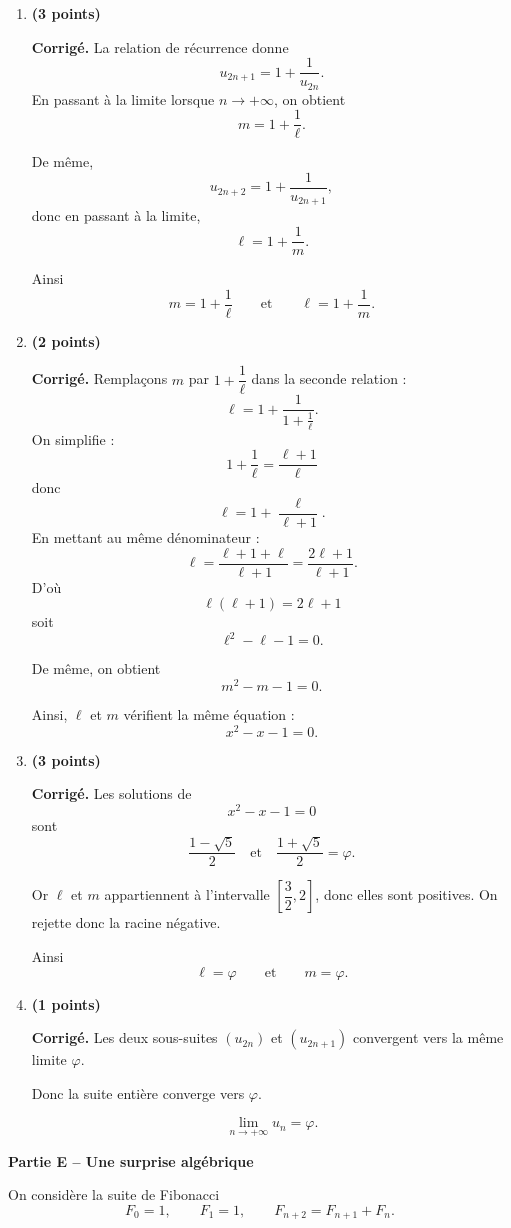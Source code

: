 \documentclass[11pt,a4paper]{article}
\newcommand{\bareme}[1]{\hfill{\color{blue!70!black}\textbf{(#1 points)}}}
\newcommand{\corr}{\noindent\textcolor{blue!70!black}{\textbf{Corrigé. }}}
\begin{document}
\begin{enumerate}[label=\textbf{D.\arabic*.}, leftmargin=0.9cm]

\item \bareme{3}

\corr La relation de récurrence donne
\[
u_{2n+1}=1+\frac1{u_{2n}}.
\]
En passant à la limite lorsque $n\to+\infty$, on obtient
\[
m=1+\frac1\ell.
\]

De même,
\[
u_{2n+2}=1+\frac1{u_{2n+1}},
\]
donc en passant à la limite,
\[
\ell=1+\frac1m.
\]

Ainsi
\[
\boxed{m=1+\frac1\ell \qquad \text{et} \qquad \ell=1+\frac1m.}
\]

\item \bareme{2}

\corr Remplaçons $m$ par $1+\dfrac1\ell$ dans la seconde relation :
\[
\ell=1+\frac1{1+\frac1\ell}.
\]
On simplifie :
\[
1+\frac1\ell=\frac{\ell+1}{\ell}
\]
donc
\[
\ell=1+\frac{\ell}{\ell+1}.
\]
En mettant au même dénominateur :
\[
\ell=\frac{\ell+1+\ell}{\ell+1}=\frac{2\ell+1}{\ell+1}.
\]
D’où
\[
\ell(\ell+1)=2\ell+1
\]
soit
\[
\ell^2-\ell-1=0.
\]

De même, on obtient
\[
m^2-m-1=0.
\]

Ainsi, $\ell$ et $m$ vérifient la même équation :
\[
\boxed{x^2-x-1=0.}
\]

\item \bareme{3}

\corr Les solutions de
\[
x^2-x-1=0
\]
sont
\[
\frac{1-\sqrt5}{2}
\quad \text{et} \quad
\frac{1+\sqrt5}{2}=\varphi.
\]

Or $\ell$ et $m$ appartiennent à l’intervalle $\left[\dfrac32,2\right]$, donc elles sont positives. On rejette donc la racine négative.

Ainsi
\[
\boxed{\ell=\varphi \qquad \text{et} \qquad m=\varphi.}
\]

\item \bareme{1}

\corr Les deux sous-suites $(u_{2n})$ et $(u_{2n+1})$ convergent vers la même limite $\varphi$.

Donc la suite entière converge vers $\varphi$.

\[
\boxed{\lim_{n\to+\infty}u_n=\varphi.}
\]

\end{enumerate}

\medskip

\textbf{Partie E -- Une surprise algébrique}

On considère la suite de Fibonacci
\[
F_0=1,\qquad F_1=1,\qquad F_{n+2}=F_{n+1}+F_n.
\]
\end{document}
